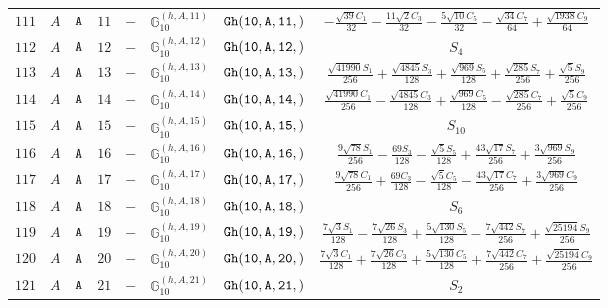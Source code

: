 \documentclass[fleqn,8pt]{jsarticle}
\begin{document}
\begin{table}[ht!]
\begin{center}
\begin{tabular}{cccccccc}
$ 111 $ & $ A $ & $ {\tt A} $ & $ 11 $ & $ - $ & $ \mathbb{G}_{10}^{(h,A,11)} $ & $ {\tt Gh(10,A,11,)} $ & $ - \frac{\sqrt{39} C_{1}}{32} - \frac{11 \sqrt{2} C_{3}}{32} - \frac{5 \sqrt{10} C_{5}}{32} - \frac{\sqrt{34} C_{7}}{64} + \frac{\sqrt{1938} C_{9}}{64} $ \\
$ 112 $ & $ A $ & $ {\tt A} $ & $ 12 $ & $ - $ & $ \mathbb{G}_{10}^{(h,A,12)} $ & $ {\tt Gh(10,A,12,)} $ & $ S_{4} $ \\
$ 113 $ & $ A $ & $ {\tt A} $ & $ 13 $ & $ - $ & $ \mathbb{G}_{10}^{(h,A,13)} $ & $ {\tt Gh(10,A,13,)} $ & $ \frac{\sqrt{41990} S_{1}}{256} + \frac{\sqrt{4845} S_{3}}{128} + \frac{\sqrt{969} S_{5}}{128} + \frac{\sqrt{285} S_{7}}{256} + \frac{\sqrt{5} S_{9}}{256} $ \\
$ 114 $ & $ A $ & $ {\tt A} $ & $ 14 $ & $ - $ & $ \mathbb{G}_{10}^{(h,A,14)} $ & $ {\tt Gh(10,A,14,)} $ & $ \frac{\sqrt{41990} C_{1}}{256} - \frac{\sqrt{4845} C_{3}}{128} + \frac{\sqrt{969} C_{5}}{128} - \frac{\sqrt{285} C_{7}}{256} + \frac{\sqrt{5} C_{9}}{256} $ \\
$ 115 $ & $ A $ & $ {\tt A} $ & $ 15 $ & $ - $ & $ \mathbb{G}_{10}^{(h,A,15)} $ & $ {\tt Gh(10,A,15,)} $ & $ S_{10} $ \\
$ 116 $ & $ A $ & $ {\tt A} $ & $ 16 $ & $ - $ & $ \mathbb{G}_{10}^{(h,A,16)} $ & $ {\tt Gh(10,A,16,)} $ & $ \frac{9 \sqrt{78} S_{1}}{256} - \frac{69 S_{3}}{128} - \frac{\sqrt{5} S_{5}}{128} + \frac{43 \sqrt{17} S_{7}}{256} + \frac{3 \sqrt{969} S_{9}}{256} $ \\
$ 117 $ & $ A $ & $ {\tt A} $ & $ 17 $ & $ - $ & $ \mathbb{G}_{10}^{(h,A,17)} $ & $ {\tt Gh(10,A,17,)} $ & $ \frac{9 \sqrt{78} C_{1}}{256} + \frac{69 C_{3}}{128} - \frac{\sqrt{5} C_{5}}{128} - \frac{43 \sqrt{17} C_{7}}{256} + \frac{3 \sqrt{969} C_{9}}{256} $ \\
$ 118 $ & $ A $ & $ {\tt A} $ & $ 18 $ & $ - $ & $ \mathbb{G}_{10}^{(h,A,18)} $ & $ {\tt Gh(10,A,18,)} $ & $ S_{6} $ \\
$ 119 $ & $ A $ & $ {\tt A} $ & $ 19 $ & $ - $ & $ \mathbb{G}_{10}^{(h,A,19)} $ & $ {\tt Gh(10,A,19,)} $ & $ \frac{7 \sqrt{3} S_{1}}{128} - \frac{7 \sqrt{26} S_{3}}{128} + \frac{5 \sqrt{130} S_{5}}{128} - \frac{7 \sqrt{442} S_{7}}{256} + \frac{\sqrt{25194} S_{9}}{256} $ \\
$ 120 $ & $ A $ & $ {\tt A} $ & $ 20 $ & $ - $ & $ \mathbb{G}_{10}^{(h,A,20)} $ & $ {\tt Gh(10,A,20,)} $ & $ \frac{7 \sqrt{3} C_{1}}{128} + \frac{7 \sqrt{26} C_{3}}{128} + \frac{5 \sqrt{130} C_{5}}{128} + \frac{7 \sqrt{442} C_{7}}{256} + \frac{\sqrt{25194} C_{9}}{256} $ \\
$ 121 $ & $ A $ & $ {\tt A} $ & $ 21 $ & $ - $ & $ \mathbb{G}_{10}^{(h,A,21)} $ & $ {\tt Gh(10,A,21,)} $ & $ S_{2} $ \\
 \hline \hline
\end{tabular}
\end{center}
\end{table}
\end{document}
